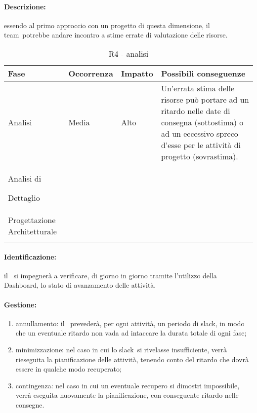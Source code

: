 \documentclass[../PianoProgetto.tex]{subfiles}
\begin{document}
	\paragraph*{Descrizione:} essendo al primo approccio con un progetto di questa dimensione, il team\g\ potrebbe andare incontro a stime errate di valutazione delle risorse.
	
	
	\begin{table}[h]
		\centering
		\begin{tabularx}{\textwidth}{F O O P}
			\toprule
			\textbf{Fase} & \textbf{Occorrenza} & \textbf{Impatto} & \textbf{Possibili conseguenze}\\
			\midrule
			Analisi & Media & Alto & Un'errata stima delle risorse può portare ad un ritardo nelle date di consegna (sottostima) o ad un eccessivo spreco d'esse per le attività di progetto (sovrastima). \\
			\midrule
			Analisi di \par Dettaglio & & & \\
			\midrule
			Progettazione Architetturale & & & \\
			\bottomrule
		\end{tabularx}
		\caption{R4 - analisi}
		\label{tab:R4-analisi}	
	\end{table}
	
	\paragraph*{Identificazione:} il \responsabilediprogetto\ si impegnerà a verificare, di giorno in giorno tramite l'utilizzo della Dashboard\g, lo stato di avanzamento delle attività.
	
	\paragraph*{Gestione:}
	\begin{enumerate}
		\item annullamento: il \responsabilediprogetto\ prevederà, per ogni attività, un periodo di slack\g, in modo che un eventuale ritardo non vada ad intaccare la durata totale di ogni fase\g ;
		\item minimizzazione: nel caso in cui lo slack\g\ si rivelasse insufficiente, verrà rieseguita la pianificazione delle attività, tenendo conto del ritardo che dovrà essere in qualche modo recuperato;
		\item contingenza: nel caso in cui un eventuale recupero si dimostri impossibile, verrà eseguita nuovamente la pianificazione, con conseguente ritardo nelle consegne.
	\end{enumerate}	
	
\end{document}
